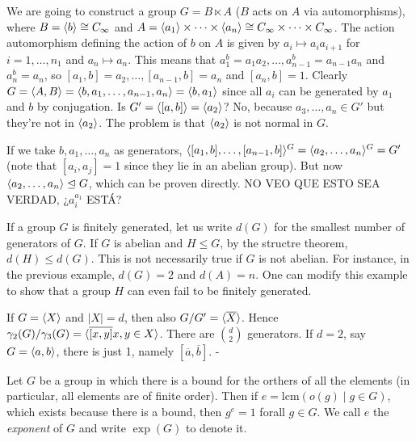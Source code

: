 \documentclass[twoside, 11pt]{article}
\begin{document}
\begin{ej}
We are going to construct a group $G=B\ltimes A$ ($B$ acts on $A$ via automorphisms), where $B=\langle{b}\rangle\cong C_\infty$ and $A=\langle{a_1}\rangle\times\cdots\times\langle{a_n}\rangle\cong C_\infty\times\cdots\times C_\infty$. The action automorphism defining the action of $b$ on $A$ is given by $a_i\mapsto a_ia_{i+1}$ for $i=1,\dots, n_1$ and $a_n\mapsto a_n$. This means that $a_1^b=a_1a_2,\dots, a_{n-1}^b=a_{n-1}a_n$ and $a_n^b=a_n$, so $[a_1,b]=a_2,\dots,[a_{n-1},b]=a_n$ and $[a_n,b]=1$. Clearly $G=\langle{A,B}\rangle=\langle{b,a_1,\dots, a_{n-1},a_n}\rangle=\langle{b,a_1}\rangle$ since all $a_i$ can be generated by $a_1$ and $b$ by conjugation. Is $G'=\langle{[a,b]}\rangle=\langle{a_2}\rangle$? No, because $a_3,\dots, a_n\in G'$ but they're not in $\langle{a_2}\rangle$. The problem is that $\langle{a_2}\rangle$ is not normal in $G$.

If we take $b,a_1,\dots, a_n$ as generators, $\langle{[a_1, b],\dots, [a_{n-1},b]}\rangle^G=\langle{a_2,\dots, a_n}\rangle^G=G'$ (note that $[a_i,a_j]=1$ since they lie in an abelian group). But now $\langle{a_2,\dots, a_n}\rangle\trianglelefteq G$, which can be proven directly. NO VEO QUE ESTO SEA VERDAD, ¿$a_i^{a_1}$ ESTÁ?
\end{ej}

If a group $G$ is finitely generated, let us write $d(G)$ for the smallest number of generators of $G$. If $G$ is abelian and $H\leq G$, by the structre theorem, $d(H)\leq d(G)$. This is not necessarily true if $G$ is not abelian. For instance, in the previous example, $d(G)=2$ and $d(A)=n$. One can modify this example to show that a group $H$ can even fail to be finitely generated. 

%
%
\begin{ej}
If $G=\langle{X}\rangle$ and $|X|=d$, then also $G/G'=\langle{\overline{X}}\rangle$. Hence $\gamma_2(G)/\gamma_3(G)=\langle{\overline{[x,y]}x,y\in X}\rangle$. There are $\binom{d}{2}$ generators. If $d=2$, say $G=\langle{a,b}\rangle$, there is just 1, namely $[\overline{a},\overline{b}]$. -
\end{ej}

\begin{defi}
Let $G$ be a group in which there is a bound for the orthers of all the elements (in particular, all elements are of finite order). Then if $e=\mathrm{lcm}(o(g)\mid g\in G)$, which exists because there is a bound, then $g^e=1$ forall $g\in G$. We call $e$ the \emph{exponent} of $G$ and write $\exp(G)$ to denote it.
\end{defi}
\end{document}
